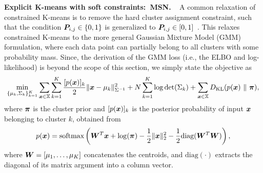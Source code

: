 \documentclass{article} %
\begin{document}
{\bf Explicit K-means with soft constraints:~MSN.}
~
A common relaxation of constrained K-means is to remove the hard cluster assignment constraint, such that the condition ${\bm{P}}_{i,j} \in \{0,1\}$ is generalized to ${\bm{P}}_{i,j} \in [0,1]$~\citep{wang2010learning}.
This relaxes constrained K-means to the more general Gaussian Mixture Model (GMM) formulation, where each data point can partially belong to all clusters with some probability mass.
Since, the derivation of the GMM loss (i.e., the ELBO and log-likelihood) is beyond the scope of this section, we simply state the objective as
\begin{equation}
    \min_{\{\mu_k,\Sigma_k\}_{k=1}^K}\sum_{\vx \in \sX}\sum_{k=1}^{K}
     \frac{[p(\vx)]_k}{2}\lVert\vx-\mu_k\rVert^2_{\Sigma^{-1}}+N\sum_{k=1}^{K}\log\det(\Sigma_k)+
     \sum_{\vx \in \sX}D_{\text{KL}}(p(\vx)\ \lVert\ \vpi),\label{eq:GMM}
\end{equation}
where ${\bm{\pi}}$ is the cluster prior and $[p({\bm{x}})]_k$ is the posterior probability of input ${\bm{x}}$ belonging to cluster $k$, obtained from
\[
    p({\bm{x}})=\text{softmax}\left({\bm{W}}^T {\bm{x}}+\log ({\bm{\pi}})-\frac{1}{2}\lVert {\bm{x}} \rVert_2^2 - \frac{1}{2}\text{diag}({\bm{W}}^T{\bm{W}})\right),
\]
where ${\bm{W}}=[\mu_1,\dots,\mu_K]$ concatenates the centroids, and $\text{diag}(\cdot)$ extracts the diagonal of its matrix argument into a column vector.
\end{document}
